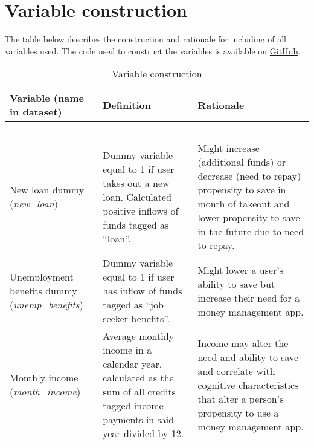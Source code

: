 
\section{Variable construction}%
\label{sec:variable_construction}

The table below describes the construction and rationale for including of all
variables used. The code used to construct the variables is available on
\href{https://github.com/fabiangunzinger/mdb_eval/blob/d094f8cd364f64bbe3d4e644abbff726af86de2f/src/data/aggregators.py}{GitHub}.

\begin{table}[htpb]
    \centering\scriptsize
    \caption{Variable construction}
    \label{tab:vars}
    \begin{tabularx}{\textwidth}{>{\raggedright\arraybackslash}X
        >{\raggedright\arraybackslash}X>{\raggedright\arraybackslash}X}
    \hline\hline
    Variable (name in dataset) & Definition  & Rationale \\
    \hline\\
    \multicolumn{3}{c}{\textbf{Primary outcome}}\\\\

    \multicolumn{3}{c}{\textbf{Covariates}}\\\\

    New loan dummy (\textit{new\_loan})&
    Dummy variable equal to 1 if user takes out a new loan. Calculated positive inflows
    of funds tagged as ``loan''.&
    Might increase (additional funds) or decrease (need to repay) propensity to
    save in month of takeout and lower propensity to save in the future due to
    need to repay.\\

    Unemployment benefits dummy (\textit{unemp\_benefits})&
    Dummy variable equal to 1 if user has inflow of funds tagged as ``job
    seeker benefits''.&
    Might lower a user's ability to save but increase their need for a money
    management app.\\

    Monthly income (\textit{month\_income})&
    Average monthly income in a calendar year, calculated as the sum of all
    credits tagged income payments in said year divided by 12.&
    Income may alter the need and ability to save and correlate with cognitive
    characteristics that alter a person's propensity to use a money management
    app.\\

    \hline\hline
    \end{tabularx}
\end{table}

